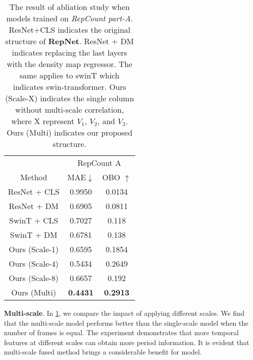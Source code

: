 \documentclass[10pt,twocolumn,letterpaper]{article}
\begin{document}
\begin{table}[ht]
	\begin{center}
		\begin{tabular}{c|cc}
			\hline
			                                    & \multicolumn{2}{c}{RepCount A}                         \\ \cline{1-3}
			Method                              & \multicolumn{1}{c|}{MAE$\downarrow$} & OBO  $\uparrow$ \\ \cline{1-3}
			ResNet  \cite{ResNet} + CLS          & \multicolumn{1}{c|}{0.9950}          & 0.0134          \\
			ResNet  \cite{ResNet} + DM           & \multicolumn{1}{c|}{0.6905}          & 0.0811          \\
			SwinT \cite{swin-transformer} + CLS & \multicolumn{1}{c|}{0.7027}          & 0.118           \\
			SwinT \cite{swin-transformer} + DM  & \multicolumn{1}{c|}{0.6781}          & 0.138           \\
Ours (Scale-1)                             & \multicolumn{1}{c|}{0.6595} & 0.1854                  \\
            Ours (Scale-4)                             & \multicolumn{1}{c|}{0.5434} & 0.2649                                  \\
            Ours (Scale-8)   & \multicolumn{1}{c|}{0.6657} & 0.192  \\
			Ours (Multi)                       & \multicolumn{1}{c|}{\textbf{0.4431}} & \textbf{0.2913} \\ \cline{1-3}
		\end{tabular}
	\end{center}
	\caption{
		The result of abliation study when models trained on \emph{RepCount part-A}.
		ResNet+CLS indicates the original structure of \textbf{RepNet}\cite{RepNet}. ResNet + DM indicates replacing the last layers with the density map regressor. The same applies to swinT which indicates swin-transformer. Ours (Scale-X) indicates the single column without multi-scale correlation, where X represent $V_1$, $V_2$, and $V_3$. Ours (Multi) indicates our proposed structure.
	}

	\label{tab:ablation}

\end{table}

\noindent \textbf{Multi-scale}. In \cref{tab:ablation}, we compare the impact of applying different scales. We find that the multi-scale model performs better than the single-scale model when the number of frames is equal. The experiment demonstrates that more temporal features at different scales can obtain more period information. It is evident that multi-scale fused method brings a considerable benefit for model. 
\end{document}

